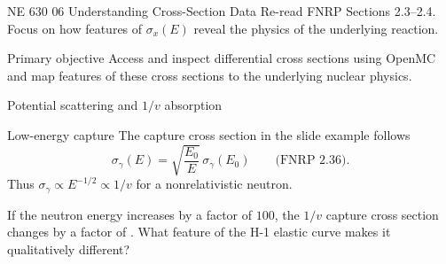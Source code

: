 
\HandoutSetup
  {NE 630}
  {06}
  {Understanding Cross-Section Data}
  {Re-read FNRP Sections 2.3--2.4. Focus on how features of $\sigma_x(E)$ reveal the physics of the underlying reaction.}


\MakeHandoutTitle

\begin{handoutcolumns}

\begin{fixedbox}{Primary objective}
Access and inspect differential cross sections using OpenMC and map features
of these cross sections to the underlying nuclear physics.
\end{fixedbox}





\begin{fixedbox}{Potential scattering and $1/v$ absorption}
\centering
{}
\end{fixedbox}

\begin{fixedbox}{Low-energy capture}
The capture cross section in the slide example follows
\[
 \boxed{\sigma_{\gamma}(E)
   = \sqrt{\frac{E_0}{E}}\,\sigma_{\gamma}(E_0)}
 \qquad\text{(FNRP 2.36)}.
\]
Thus $\sigma_\gamma\propto E^{-1/2}\propto 1/v$ for a nonrelativistic neutron.
\end{fixedbox}

\begin{checkpoint}[$1/v$ check]
If the neutron energy increases by a factor of $100$, the $1/v$ capture cross
section changes by a factor of .
What feature of the H-1 elastic curve makes it qualitatively different?
\end{checkpoint}


\end{handoutcolumns}

